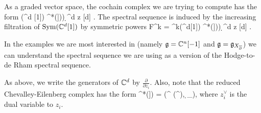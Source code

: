 \documentclass[10pt]{amsart}
\begin{document}
As a graded vector space, the cochain complex we are trying to compute has the form
\ben
\Sym(\CC^d [1]) \tensor \cred^*\left(\fg[[z_1,\ldots,z_d]])\right) \d^d z [d] .
\een
The spectral sequence is induced by the increasing filtration of ${\rm Sym}(\mathbb C^d [1])$ by symmetric powers
\ben
F^k = \Sym^{\leq k}(\CC^d[1]) \tensor \cred^*\left(\fg[[z_1,\ldots,z_d]])\right) \d^d z [d] .
\een

\begin{rmk}
In the examples we are most interested in (namely $\mathfrak g = \mathbb C^n[-1]$ and $\mathfrak g = \mathfrak g_{X_{\overline{\partial}}}$) we can understand the spectral sequence we are using as a version of the Hodge-to-de Rham spectral sequence.
\end{rmk}

As above, we write the generators of $\mathbb C^d$ by $\frac{\partial}{\partial z_i}$. 
Also, note that the reduced Chevalley-Eilenberg complex has the form
\ben
\cred^*(\fg[[z_1,\ldots,z_n]]) = \left(\Sym^{} \left(\fg^ \right), \d_{\fg}\right),
\een
where $z_i^\vee$ is the dual variable to $z_i$. 
\end{document}
